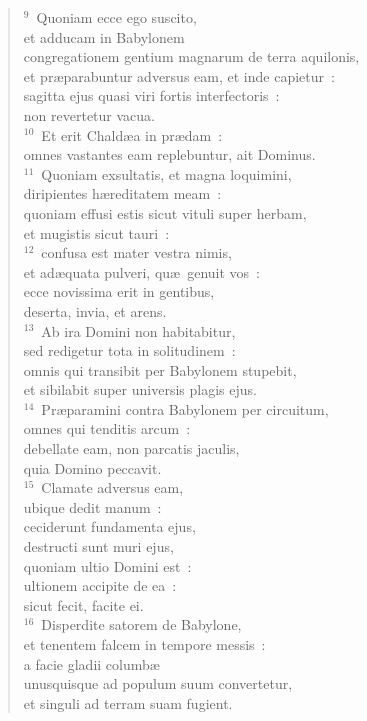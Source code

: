 \begin{flushleft}
\begin{verse}
${}^{9}$~Quoniam ecce ego suscito,\\ et adducam in Babylonem\\ congregationem gentium magnarum de terra aquilonis,\\ et pr\ae parabuntur adversus eam, et inde capietur~:\\ sagitta ejus quasi viri fortis interfectoris~:\\ non revertetur vacua.\\
${}^{10}$~Et erit Chald\ae a in pr\ae dam~:\\ omnes vastantes eam replebuntur, ait Dominus.\\
${}^{11}$~Quoniam exsultatis, et magna loquimini,\\ diripientes h\ae reditatem meam~:\\ quoniam effusi estis sicut vituli super herbam,\\ et mugistis sicut tauri~:\\
${}^{12}$~confusa est mater vestra nimis,\\ et ad\ae quata pulveri, qu\ae\ genuit vos~:\\ ecce novissima erit in gentibus,\\ deserta, invia, et arens.\\
${}^{13}$~Ab ira Domini non habitabitur,\\ sed redigetur tota in solitudinem~:\\ omnis qui transibit per Babylonem stupebit,\\ et sibilabit super universis plagis ejus.\\
${}^{14}$~Pr\ae paramini contra Babylonem per circuitum,\\ omnes qui tenditis arcum~:\\ debellate eam, non parcatis jaculis,\\ quia Domino peccavit.\\
${}^{15}$~Clamate adversus eam,\\ ubique dedit manum~:\\ ceciderunt fundamenta ejus,\\ destructi sunt muri ejus,\\ quoniam ultio Domini est~:\\ ultionem accipite de ea~:\\ sicut fecit, facite ei.\\
${}^{16}$~Disperdite satorem de Babylone,\\ et tenentem falcem in tempore messis~:\\ a facie gladii columb\ae \\ unusquisque ad populum suum convertetur,\\ et singuli ad terram suam fugient.\\

\end{verse}
\end{flushleft}
